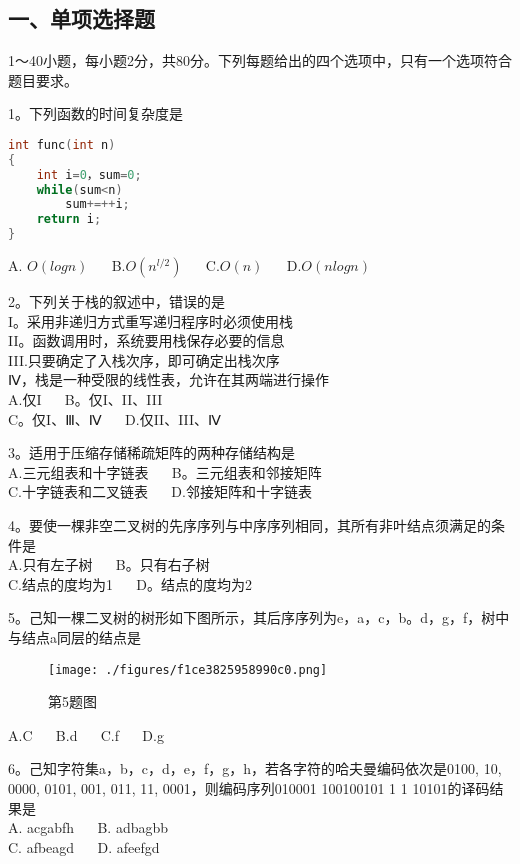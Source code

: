 

\subsection{一、单项选择题}
1～40小题，每小题2分，共80分。下列每题给出的四个选项中，只有一个选项符合题目要求。

1。下列函数的时间复杂度是 \\
\begin{lstlisting}[language=cpp]
int func(int n)
{
    int i=0，sum=0;
    while(sum<n)
        sum+=++i;
    return i;
}
\end{lstlisting}
A. $O(log n)$ $\quad$ B.$O(n^{l/2})$  $\quad$  C.$O(n)$  $\quad$  D.$O(nlogn)$

2。下列关于栈的叙述中，错误的是 \\
I。采用非递归方式重写递归程序时必须使用栈 \\
II。函数调用时，系统要用栈保存必要的信息 \\
III.只要确定了入栈次序，即可确定出栈次序 \\
Ⅳ，栈是一种受限的线性表，允许在其两端进行操作 \\
A.仅I  $\quad$  B。仅I、II、III \\
C。仅I、Ⅲ、Ⅳ  $\quad$  D.仅II、III、Ⅳ

3。适用于压缩存储稀疏矩阵的两种存储结构是 \\
A.三元组表和十字链表 $\quad$ B。三元组表和邻接矩阵 \\
C.十字链表和二叉链表 $\quad$ D.邻接矩阵和十字链表

4。要使一棵非空二叉树的先序序列与中序序列相同，其所有非叶结点须满足的条件是 \\
A.只有左子树  $\quad$  B。只有右子树 \\
C.结点的度均为1 $\quad$ D。结点的度均为2

5。己知一棵二叉树的树形如下图所示，其后序序列为e，a，c，b。d，g，f，树中与结点a同层的结点是 \\
\begin{figure}[ht]
\centering
\texttt{[image: ./figures/f1ce3825958990c0.png]}
\caption{第5题图} \label{fig_CSN17_1}
\end{figure}
A.C $\quad$ B.d $\quad$ C.f $\quad$ D.g

6。己知字符集{a，b，c，d，e，f，g，h}，若各字符的哈夫曼编码依次是0100, 10, 0000, 0101, 001, 011, 11, 0001，则编码序列010001 100100101 1 1 10101的译码结果是 \\
A. acgabfh  $\quad$  B. adbagbb  \\
C. afbeagd  $\quad$  D. afeefgd

